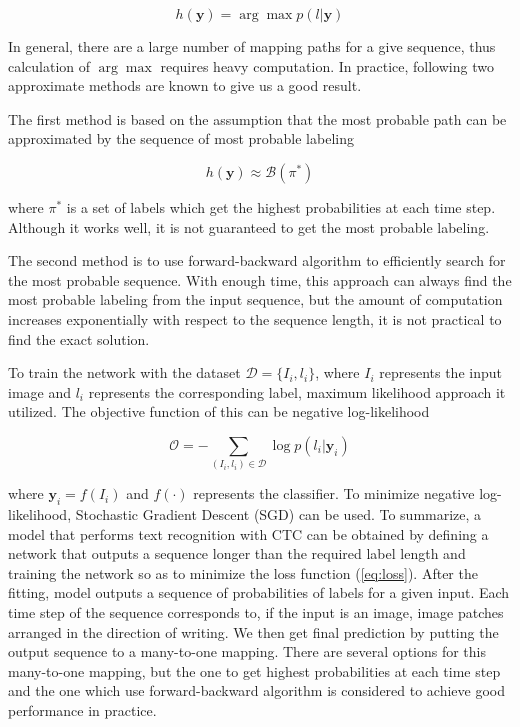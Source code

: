 \begin{equation}
    h(\mathbf{y}) = \arg\max p(l|\mathbf{y})
\end{equation}

In general, there are a large number of mapping paths for a give sequence, thus
calculation of $\arg\max$ requires heavy computation. In practice, following two approximate
methods are known to give us a good result.

The first method is based on the assumption that the most probable path can be approximated
by the sequence of most probable labeling

\begin{equation}
    h(\mathbf{y})\approx\mathcal{B}(\pi^*)
\end{equation}

where $\pi^{*}$ is a set of labels which get the highest probabilities at each time step.
Although it works well, it is not guaranteed to get the most probable labeling.

The second method is to use forward-backward algorithm to efficiently search for the most
probable sequence. With enough time, this approach can always find the most probable labeling
from the input sequence, but the amount of computation increases exponentially with respect to
the sequence length, it is not practical to find the exact solution.

To train the network with the dataset $\mathcal{D} = \{I_i, l_i\}$, where $I_i$ represents
the input image and $l_i$ represents the corresponding label, maximum likelihood approach
it utilized. The objective function of this can be negative log-likelihood

\begin{equation}
    \mathcal{O} = -\sum_{(I_i, l_i)\in\mathcal{D}} \log p(l_i|\mathbf{y}_i)
    \label{eq:loss}
\end{equation}

where $\mathbf{y}_i = f(I_i)$ and $f(\cdot)$ represents the classifier. To minimize negative
log-likelihood, Stochastic Gradient Descent (SGD) can be used. To summarize,
a model that performs text recognition with CTC can be obtained by defining a network
that outputs a sequence longer than the required label length and
training the network so as to minimize the loss function (\ref{eq:loss}). After the fitting,
model outputs a sequence of probabilities of labels for a given input. Each time step of the sequence
corresponds to, if the input is an image, image patches arranged in the direction of writing.
We then get final prediction by putting the output sequence to a many-to-one mapping.
There are several options for this many-to-one mapping, but the one to get highest probabilities
at each time step and the one which use forward-backward algorithm is considered to achieve
good performance in practice.
